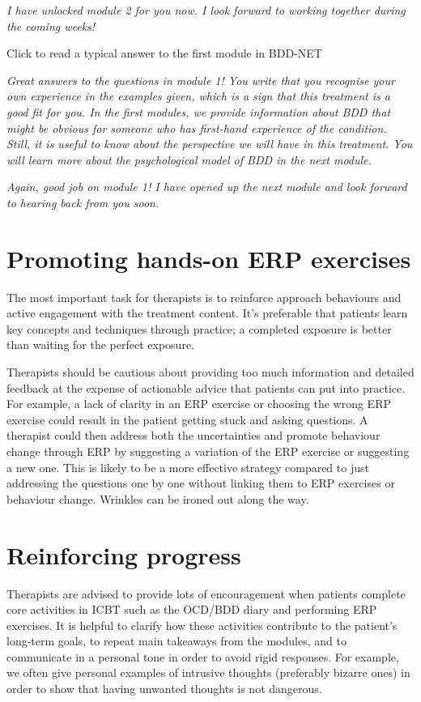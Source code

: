 \documentclass[]{book}
\begin{document}
\emph{I have unlocked module 2 for you now. I look forward to working together during the coming weeks!}

Click to read a typical answer to the first module in BDD-NET

\emph{Great answers to the questions in module 1! You write that you recognise your own experience in the examples given, which is a sign that this treatment is a good fit for you. In the first modules, we provide information about BDD that might be obvious for someone who has first-hand experience of the condition. Still, it is useful to know about the perspective we will have in this treatment. You will learn more about the psychological model of BDD in the next module.}

\emph{Again, good job on module 1! I have opened up the next module and look forward to hearing back from you soon.}

\hypertarget{promoting-hands-on-erp-exercises}{%
\section{Promoting hands-on ERP exercises}\label{promoting-hands-on-erp-exercises}}

The most important task for therapists is to reinforce approach behaviours and active engagement with the treatment content. It's preferable that patients learn key concepts and techniques through practice; a completed exposure is better than waiting for the perfect exposure.

Therapists should be cautious about providing too much information and detailed feedback at the expense of actionable advice that patients can put into practice. For example, a lack of clarity in an ERP exercise or choosing the wrong ERP exercise could result in the patient getting stuck and asking questions. A therapist could then address both the uncertainties and promote behaviour change through ERP by suggesting a variation of the ERP exercise or suggesting a new one. This is likely to be a more effective strategy compared to just addressing the questions one by one without linking them to ERP exercises or behaviour change. Wrinkles can be ironed out along the way.

\hypertarget{reinforcing-progress}{%
\section{Reinforcing progress}\label{reinforcing-progress}}

Therapists are advised to provide lots of encouragement when patients complete core activities in ICBT such as the OCD/BDD diary and performing ERP exercises. It is helpful to clarify how these activities contribute to the patient's long-term goals, to repeat main takeaways from the modules, and to communicate in a personal tone in order to avoid rigid responses. For example, we often give personal examples of intrusive thoughts (preferably bizarre ones) in order to show that having unwanted thoughts is not dangerous.
\end{document}
